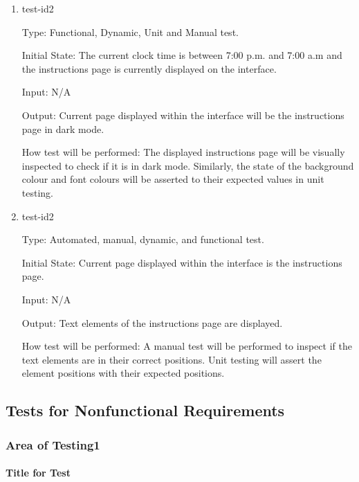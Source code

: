 \documentclass[12pt, titlepage]{article}
\begin{document}
\begin{enumerate}
\item{test-id2\\}

Type: Functional, Dynamic, Unit and Manual test.
					
Initial State:  The current clock time is between 7:00 p.m. and 7:00 a.m and the instructions page is currently displayed on the interface.
					
Input: N/A
					
Output: Current page displayed within the interface will be the instructions page in dark mode.
					
How test will be performed: The displayed instructions page will be visually inspected to check if it is in dark mode. Similarly, the state of the background colour and font colours will be asserted to their expected values in unit testing. 



\item{test-id2\\}

Type: Automated, manual, dynamic, and functional test.
					
Initial State: Current page displayed within the interface is the instructions page.
					
Input: N/A
					
Output: Text elements of the instructions page are displayed.
					
How test will be performed: A manual test will be performed to inspect if the text elements are in their correct positions. Unit testing will assert the element positions with their expected positions. 

\end{enumerate}


\subsection{Tests for Nonfunctional Requirements}

\subsubsection{Area of Testing1}
		
\paragraph{Title for Test}
\end{document}
